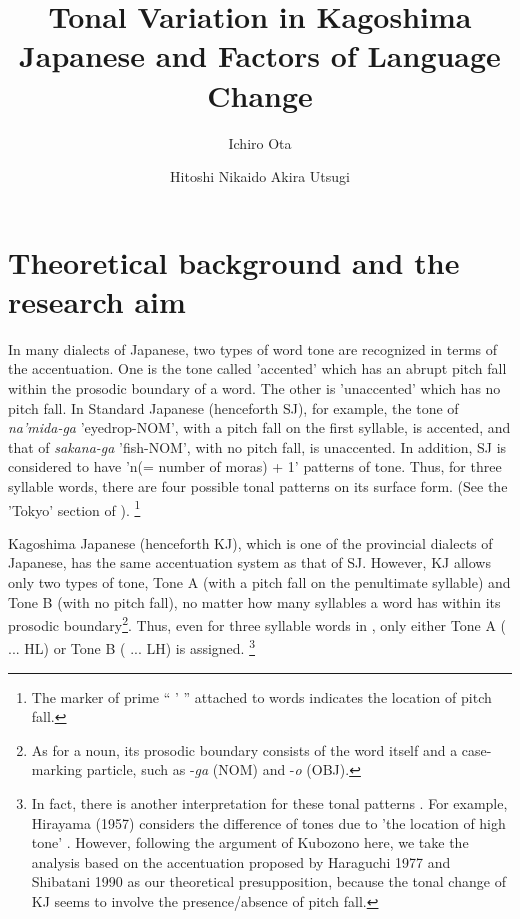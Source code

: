 \documentclass[output=paper]{LSP/langsci}
\author{Ichiro Ota\affiliation{Kagoshima University} \and Hitoshi Nikaido\affiliation{Fukuoka Jo Gakuin University} \lastand Akira Utsugi\affiliation{Nagoya University}}
\title{Tonal Variation in Kagoshima Japanese and Factors of Language Change}
\begin{document}
 

\section{Theoretical background and the research aim}
     In many dialects of Japanese, two types of word tone are recognized in terms of the accentuation. One is the tone called 'accented' which has an abrupt pitch fall within the prosodic boundary of a word. The other is 'unaccented' which has no pitch fall.  In Standard Japanese (henceforth SJ), for example, the tone of \textit{na'mida-ga} 'eyedrop-NOM', with a pitch fall on the first syllable, is accented, and that of \textit{sakana-ga} 'fish-NOM', with no pitch fall, is unaccented. In addition, SJ is considered to have 'n(= number of moras) + 1' patterns of tone. Thus, for three syllable words, there are four possible tonal patterns on its surface form. (See the 'Tokyo' section of ). \footnote{ The marker of prime “ ’ ” attached to words indicates the location of pitch fall.}

     Kagoshima Japanese (henceforth KJ), which is one of the provincial dialects of Japanese, has the same accentuation system as that of SJ. However, KJ allows only two types of tone, Tone A (with a pitch fall on the penultimate syllable) and Tone B (with no pitch fall), no matter how many syllables a word has within its prosodic boundary\footnote{ As for a noun, its prosodic boundary consists of the word itself and a case-marking particle, such as -\textit{ga} (NOM) and -\textit{o} (OBJ).}. Thus, even for three syllable words in , only either Tone A ( ... HL) or Tone B ( ... LH) is assigned. \footnote{ In fact, there is another interpretation for these tonal patterns \citep{kubozono_tonal_2007}. For example, Hirayama (1957) %
considers the difference of tones due to 'the location of high tone' \citep[327]{kubozono_tonal_2007}. However, following the argument of Kubozono here,  we take the analysis based on the accentuation proposed by Haraguchi 1977 and Shibatani 1990 %
as our theoretical presupposition, because the tonal change of KJ seems to involve the presence/absence of pitch fall.  
} 
 
\end{document}
